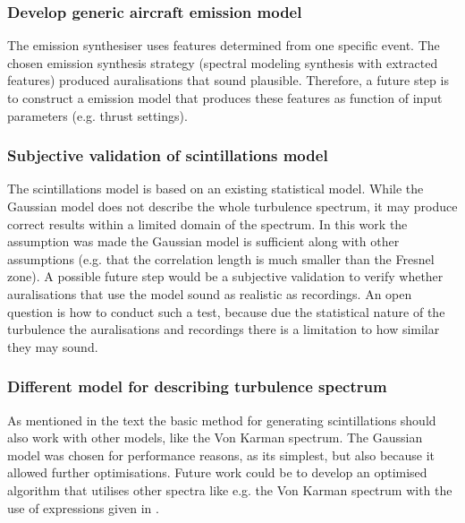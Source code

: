 \subsubsection*{Develop generic aircraft emission model}
The emission synthesiser uses features determined from one specific event. The
chosen emission synthesis strategy (spectral modeling synthesis with extracted features)
produced auralisations that sound plausible. Therefore, a future step
is to construct a emission model that produces these features as function of
input parameters (e.g. thrust settings).

\subsubsection*{Subjective validation of scintillations model}
The scintillations model is based on an existing statistical model. While the
Gaussian model does not describe the whole turbulence spectrum, it may produce
correct results within a limited domain of the spectrum. In this work the
assumption was made the Gaussian model is sufficient along with other
assumptions (e.g. that the correlation length is much smaller than the Fresnel
zone). A possible future step would be a subjective validation to verify whether
auralisations that use the model sound as realistic as recordings. An open
question is how to conduct such a test, because due the statistical nature of
the turbulence the auralisations and recordings there is a limitation to how
similar they may sound.

\subsubsection*{Different model for describing turbulence spectrum}
As mentioned in the text the basic method for generating scintillations should
also work with other models, like the Von Karman spectrum. The Gaussian model
was chosen for performance reasons, as its simplest, but also because it allowed
further optimisations. Future work could be to develop an optimised algorithm
that utilises other spectra like e.g. the Von Karman spectrum with the use of
expressions given in \cite{Ostashev2015}.

